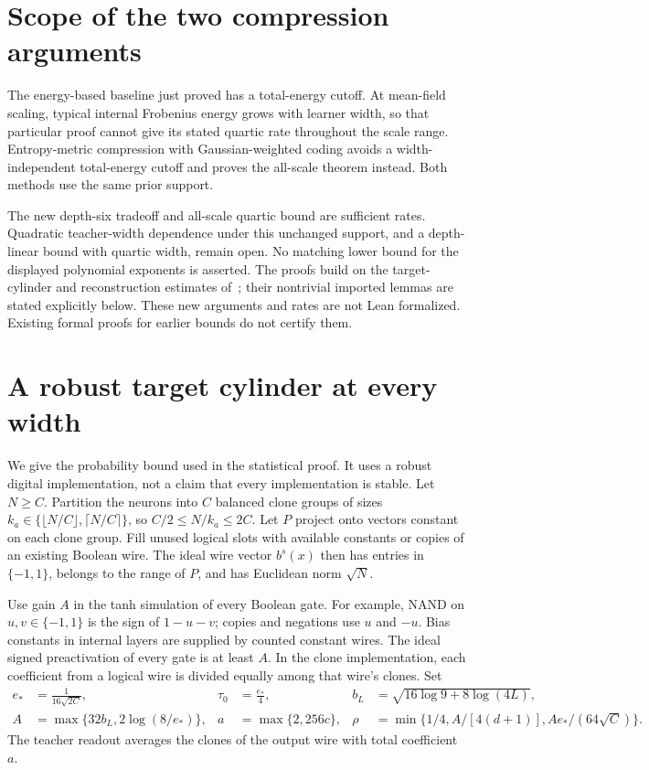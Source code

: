 \documentclass[11pt]{article}
\begin{document}
\section{Scope of the two compression arguments}

The energy-based baseline just proved has a total-energy cutoff.
At mean-field scaling, typical internal Frobenius energy grows with
learner width, so that particular proof cannot give its stated quartic
rate throughout the scale range. Entropy-metric compression with Gaussian-weighted coding avoids a
width-independent total-energy cutoff and proves the all-scale theorem
instead. Both methods use the same prior support.

The new depth-six tradeoff and all-scale quartic bound are sufficient
rates. Quadratic teacher-width dependence under this unchanged support,
and a depth-linear bound with quartic width, remain open. No matching
lower bound for the displayed polynomial exponents is asserted.
The proofs build on the target-cylinder and reconstruction estimates
of~\cite{robust-paper,quartic,all-scales}; their nontrivial imported
lemmas are stated explicitly below. These new arguments and rates are
not Lean formalized. Existing formal proofs for earlier bounds do not
certify them.

\appendix
\section{A robust target cylinder at every width}
\label{app:cylinder}

We give the probability bound used in the statistical proof. It uses a
robust digital implementation, not a claim that every implementation is
stable. Let $N\ge C$. Partition the neurons into $C$ balanced clone groups
of sizes $k_a\in\{\lfloor N/C\rfloor,\lceil N/C\rceil\}$, so
$C/2\le N/k_a\le2C$. Let $P$ project onto vectors constant on each clone
group. Fill unused logical slots with available constants or copies of an
existing Boolean wire. The ideal wire
vector $b^s(x)$ then has entries in $\{-1,1\}$, belongs to the range of
$P$, and has Euclidean norm $\sqrt N$.

Use gain $A$ in the tanh simulation of every Boolean gate. For example,
NAND on $u,v\in\{-1,1\}$ is the sign of $1-u-v$; copies and negations
use $u$ and $-u$. Bias constants in internal layers are supplied by counted
constant wires. The ideal signed preactivation of every gate is at least
$A$. In the clone implementation, each coefficient from a logical wire is
divided equally among that wire's clones. Set
\begin{align*}
 e_*&=\frac1{16\sqrt{2C}},&
 \tau_0&=\frac{e_*}{4},&
 b_L&=\sqrt{16\log9+8\log(4L)},\\
 A&=\max\{32b_L,2\log(8/e_*)\},&
 a&=\max\{2,256c\},&
 \rho&=\min\{1/4,A/[4(d+1)],Ae_*/(64\sqrt C)\}.
\end{align*}
The teacher readout averages the clones of the output wire with total
coefficient $a$.
\end{document}
